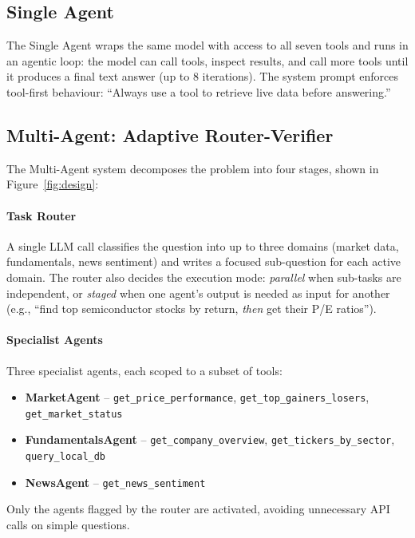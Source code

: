 \documentclass[conference]{IEEEtran}
\begin{document}
\subsection{Single Agent}

The Single Agent wraps the same model with access to all seven tools and runs in an
agentic loop: the model can call tools, inspect results, and call more tools until it
produces a final text answer (up to 8 iterations).  The system prompt enforces
tool-first behaviour: ``Always use a tool to retrieve live data before answering.''

\subsection{Multi-Agent: Adaptive Router-Verifier}

The Multi-Agent system decomposes the problem into four stages, shown in
Figure~\ref{fig:design}:

\paragraph{Task Router}
A single LLM call classifies the question into up to three domains (market data,
fundamentals, news sentiment) and writes a focused sub-question for each active domain.
The router also decides the execution mode: \emph{parallel} when sub-tasks are
independent, or \emph{staged} when one agent's output is needed as input for another
(e.g., ``find top semiconductor stocks by return, \emph{then} get their P/E ratios'').

\paragraph{Specialist Agents}
Three specialist agents, each scoped to a subset of tools:
\begin{itemize}
  \item \textbf{MarketAgent} -- \texttt{get\_price\_performance},
        \texttt{get\_top\_gainers\_losers}, \texttt{get\_market\_status}
  \item \textbf{FundamentalsAgent} -- \texttt{get\_company\_overview},
        \texttt{get\_tickers\_by\_sector}, \texttt{query\_local\_db}
  \item \textbf{NewsAgent} -- \texttt{get\_news\_sentiment}
\end{itemize}
Only the agents flagged by the router are activated, avoiding unnecessary API calls on
simple questions.
\end{document}
